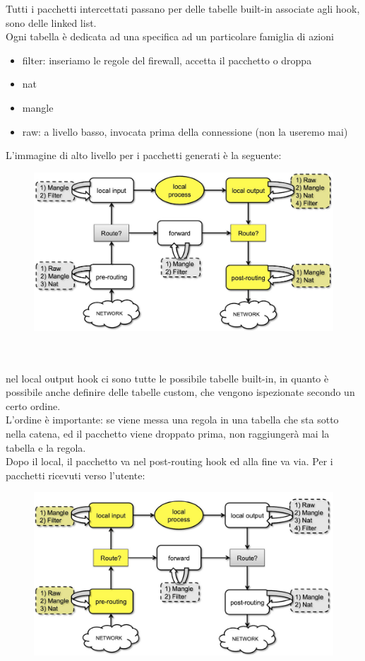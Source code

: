 \documentclass[12pt, oneside]{extbook} %
\begin{document}
Tutti i pacchetti intercettati passano per delle tabelle built-in associate agli hook, sono delle linked list.
\\Ogni tabella è dedicata ad una specifica ad un particolare famiglia di azioni
\begin{itemize}
\item filter: inseriamo le regole del firewall, accetta il pacchetto o droppa
\item nat
\item mangle
\item raw: a livello basso, invocata prima della connessione (non la useremo mai)
\end{itemize}
L'immagine di alto livello per i pacchetti generati è la seguente:\\
\begin{figure}[h!]
    \centering
    \includegraphics[scale=0.5]{../../immagini/netfilter_lh}
\end{figure}\\\\
nel local output hook ci sono tutte le possibile tabelle built-in, in quanto è possibile anche definire delle tabelle custom, che vengono ispezionate secondo un certo ordine.
\\L'ordine è importante: se viene messa una regola in una tabella che sta sotto nella catena, ed il pacchetto viene droppato prima, non raggiungerà mai la tabella e la regola.
\\Dopo il local, il pacchetto va nel post-routing hook ed alla fine va via.
Per i pacchetti ricevuti verso l'utente:\\ 
\begin{figure}[h!]
    \includegraphics[scale=0.5]{../../immagini/netfilter_recv}
\end{figure}\\\\
\end{document}
